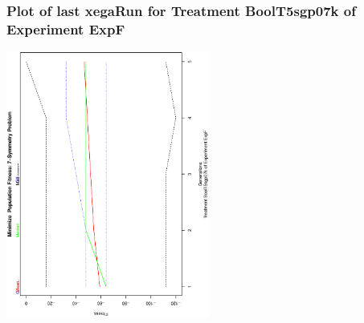  \begin{frame}
 \frametitle{ Plot of last xegaRun for Treatment BoolT5sgp07k of Experiment ExpF }
 \begin{center}
\includegraphics[width=0.5\textwidth, angle=-90]
{ExpFPlotPopStatsFigure005.eps}
 \end{center}
 \label{report/ExpFPlotPopStatsFigure005.eps}  
 \end{frame}

